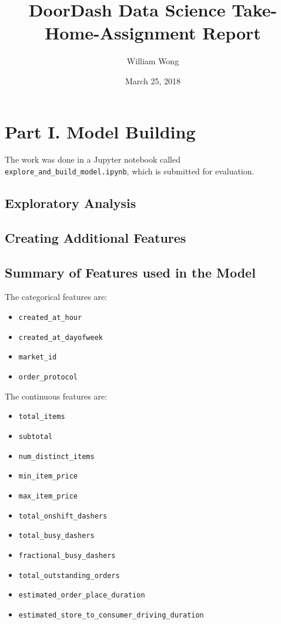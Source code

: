 \documentclass[12pt]{article}
\begin{document}
\title{DoorDash Data Science Take-Home-Assignment Report}

\author{William Wong}
\date{March 25, 2018}

\maketitle









\section{Part I. Model Building}

The work was done in a Jupyter notebook called \texttt{explore\_and\_build\_model.ipynb},
which is submitted for evaluation.

\subsection{Exploratory Analysis}


\subsection{Creating Additional Features}


\subsection{Summary of Features used in the Model}
The categorical features are:
\begin{itemize}
  \item \texttt{created\_at\_hour}
  \item \texttt{created\_at\_dayofweek}
  \item \texttt{market\_id}
  \item \texttt{order\_protocol}
\end{itemize}


The continuous features are:
\begin{itemize}
  \item \texttt{total\_items}
  \item \texttt{subtotal}
  \item \texttt{num\_distinct\_items}
  \item \texttt{min\_item\_price}
  \item \texttt{max\_item\_price}
  \item \texttt{total\_onshift\_dashers}
  \item \texttt{total\_busy\_dashers}
  \item \texttt{fractional\_busy\_dashers}
  \item \texttt{total\_outstanding\_orders}
  \item \texttt{estimated\_order\_place\_duration}
  \item \texttt{estimated\_store\_to\_consumer\_driving\_duration}
\end{itemize}
\end{document}
